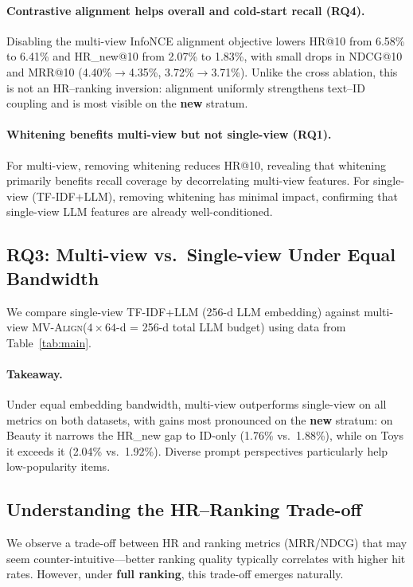 \documentclass[sigconf,natbib=true,anonymous]{acmart}
\newcommand{\model}{\textsc{MV-Align}\xspace}
\begin{document}
\paragraph{Contrastive alignment helps overall and cold-start recall (RQ4).}
Disabling the multi-view InfoNCE alignment objective lowers HR@10
from 6.58\% to 6.41\% and HR\_new@10 from 2.07\% to 1.83\%, with
small drops in NDCG@10 and MRR@10 (4.40\%$\rightarrow$4.35\%,
3.72\%$\rightarrow$3.71\%).
Unlike the cross ablation, this is not an HR--ranking inversion:
alignment uniformly strengthens text--ID coupling and is most
visible on the \textbf{new} stratum.

\paragraph{Whitening benefits multi-view but not single-view (RQ1).}
For multi-view, removing whitening reduces HR@10, revealing
that whitening primarily benefits recall coverage by decorrelating
multi-view features. For single-view (TF-IDF+LLM), removing
whitening has minimal impact, confirming that single-view LLM
features are already well-conditioned.

\subsection{RQ3: Multi-view vs.\ Single-view Under Equal Bandwidth}

We compare single-view TF-IDF+LLM (256-d LLM embedding) against
multi-view \model ($4\times 64$-d = 256-d total LLM budget) using
data from Table~\ref{tab:main}.

\paragraph{Takeaway.}
Under equal embedding bandwidth, multi-view outperforms
single-view on all metrics on both datasets, with gains most
pronounced on the \textbf{new} stratum: on Beauty it narrows the
HR\_new gap to ID-only (1.76\% vs.\ 1.88\%), while on Toys it
exceeds it (2.04\% vs.\ 1.92\%). Diverse prompt perspectives
particularly help low-popularity items.

\subsection{Understanding the HR--Ranking Trade-off}

We observe a trade-off between HR and ranking metrics (MRR/NDCG) that
may seem counter-intuitive---better ranking quality typically correlates
with higher hit rates. However, under \textbf{full ranking}, this
trade-off emerges naturally.
\end{document}
